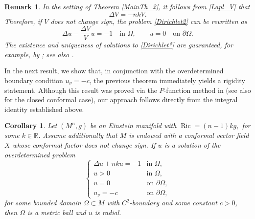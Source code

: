 \documentclass[reqno,11pt]{amsart}
\numberwithin{equation}{section}  %
\newtheorem{corollary}[theorem]{Corollary}
\newtheorem{remark}[theorem]{Remark}
\begin{document}
\begin{remark}\label{existence}
In the setting of Theorem \ref{MainTh_2}, it follows from \eqref{Lapl_V} that
\[
\Delta V=-nkV.
\]
Therefore, if $V$ does not change sign, the problem \eqref{Dirichlet2} can be rewritten as
\begin{equation}\label{Dirichlet*}
\Delta u -\frac{\Delta V}{V} u = -1 \quad \text{in } \Omega, 
\qquad 
u = 0 \quad \text{on } \partial \Omega.
\end{equation}
The existence and uniqueness of solutions to \eqref{Dirichlet*} are guaranteed, for example, by \cite[Theorem 2.3]{foga}; see also \cite[Lemma 2.5]{li-xia}.
\end{remark}
In the next result, we show that, in conjunction with the overdetermined boundary condition \(u_{\nu}=-c\), the previous theorem immediately yields a rigidity statement. Although this result was proved via the \(P\)-function method in \cite[Corollary 1]{andrade2025} (see also \cite[Theorem 2]{freitas2024} for the closed conformal case), our approach follows directly from the integral identity established above.

\begin{corollary}\label{cor:rigidity}
Let \( (M^n, g) \) be an Einstein manifold with $\operatorname{Ric} = (n-1)k g,$ for some \( k \in \mathbb{R} \). Assume additionally that \( M \) is endowed with a conformal vector field \( X \) whose conformal factor does not change sign. If \( u \) is a solution of the overdetermined problem
\[
\begin{cases}
\Delta u + nku = -1 & \text{in } \Omega,\\
u>0 & \text{in } \Omega,\\
u=0 & \text{on } \partial\Omega,\\
u_{\nu}=-c & \text{on } \partial\Omega,
\end{cases}
\]
for some bounded domain \( \Omega\subset M \) with \(C^{2}\)-boundary and some constant \(c>0\), then \( \Omega \) is a metric ball and \( u \) is radial.
\end{corollary}

\end{document}
